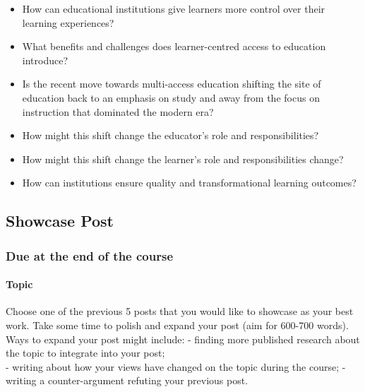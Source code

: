 \documentclass[
]{book}
\providecommand{\tightlist}{%
  \setlength{\itemsep}{0pt}\setlength{\parskip}{0pt}}
\begin{document}
\begin{itemize}
\tightlist
\item
  How can educational institutions give learners more control over their learning experiences?\\
\item
  What benefits and challenges does learner-centred access to education introduce?\\
\item
  Is the recent move towards multi-access education shifting the site of education back to an emphasis on study and away from the focus on instruction that dominated the modern era?\\
\item
  How might this shift change the educator's role and responsibilities?\\
\item
  How might this shift change the learner's role and responsibilities change?\\
\item
  How can institutions ensure quality and transformational learning outcomes?
\end{itemize}

\hypertarget{showcase-post}{%
\subsection*{Showcase Post}\label{showcase-post}}

\hypertarget{due-at-the-end-of-the-course}{%
\subsubsection*{Due at the end of the course}\label{due-at-the-end-of-the-course}}

\hypertarget{topic-3}{%
\paragraph*{Topic}\label{topic-3}}

Choose one of the previous 5 posts that you would like to showcase as your best work. Take some time to polish and expand your post (aim for 600-700 words). Ways to expand your post might include:
- finding more published research about the topic to integrate into your post;\\
- writing about how your views have changed on the topic during the course;
- writing a counter-argument refuting your previous post.
\end{document}

